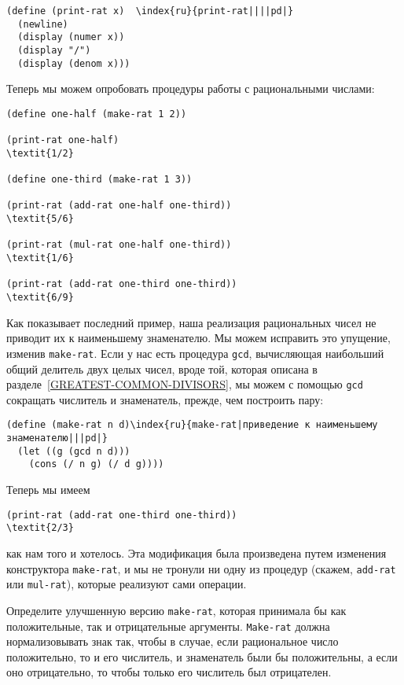 \begin{Verbatim}[fontsize=\small]
(define (print-rat x)  \index{ru}{print-rat||||pd|}
  (newline)
  (display (numer x))
  (display "/")
  (display (denom x)))
\end{Verbatim}
Теперь мы можем опробовать процедуры работы с рациональными
числами:

\begin{Verbatim}[fontsize=\small]
(define one-half (make-rat 1 2))

(print-rat one-half)
\textit{1/2}

(define one-third (make-rat 1 3))

(print-rat (add-rat one-half one-third))
\textit{5/6}

(print-rat (mul-rat one-half one-third))
\textit{1/6}

(print-rat (add-rat one-third one-third))
\textit{6/9}
\end{Verbatim}

Как показывает последний пример, наша реализация
рациональных чисел не приводит их к наименьшему знаменателю.
Мы можем исправить это упущение, изменив
{\tt make-rat}.  Если у нас 
есть процедура {\tt gcd},
вычисляющая наибольший общий делитель
двух целых чисел, вроде той, которая описана в 
разделе~\ref{GREATEST-COMMON-DIVISORS}, мы можем с помощью
{\tt gcd} сокращать числитель и знаменатель, прежде, чем 
построить пару:

\begin{Verbatim}[fontsize=\small]
(define (make-rat n d)\index{ru}{make-rat|приведение к наименьшему знаменателю|||pd|}
  (let ((g (gcd n d)))
    (cons (/ n g) (/ d g))))
\end{Verbatim}
Теперь мы имеем

\begin{Verbatim}[fontsize=\small]
(print-rat (add-rat one-third one-third))
\textit{2/3}
\end{Verbatim}
как нам того и хотелось.  Эта модификация была произведена путем
изменения конструктора {\tt make-rat}, и мы не тронули ни одну
из процедур (скажем, {\tt add-rat} или {\tt mul-rat}),
которые реализуют сами операции.
\begin{exercise}{2.1}\label{EX2.1}%
Определите улучшенную версию {\tt make-rat},
которая принимала бы как положительные, так и отрицательные
аргументы.  {\tt Make-rat} должна нормализовывать знак так,
чтобы в случае, если рациональное число положительно, то и его числитель, и
знаменатель были бы положительны, а если оно отрицательно, то чтобы только его
числитель был отрицателен.
\end{exercise}

